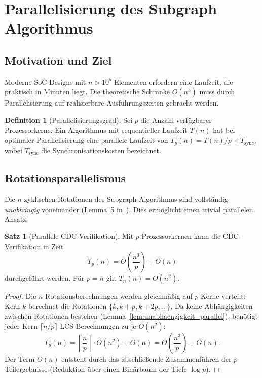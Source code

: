 ﻿\documentclass[a4paper,12pt]{article}
\theoremstyle{definition}
\newtheorem{definition}{Definition}
\newtheorem{satz}{Satz}
\begin{document}
	\section{Parallelisierung des Subgraph Algorithmus}
	
	\subsection{Motivation und Ziel}
	
	Moderne SoC-Designs mit $n > 10^5$ Elementen erfordern eine
	Laufzeit, die praktisch in Minuten liegt. Die theoretische Schranke $O(n^3)$
	muss durch Parallelisierung auf realisierbare Ausf\"uhrungszeiten gebracht
	werden.
	
	\begin{definition}[Parallelisierungsgrad]
		Sei $p$ die Anzahl verf\"ugbarer Prozessorkerne. Ein Algorithmus mit
		sequentieller Laufzeit $T(n)$ hat bei optimaler Parallelisierung eine
		parallele Laufzeit von $T_p(n) = T(n) / p + T_{\mathrm{sync}}$,
		wobei $T_{\mathrm{sync}}$ die Synchronisationskosten bezeichnet.
	\end{definition}
	
	\subsection{Rotationsparallelismus}
	
	Die $n$ zyklischen Rotationen des Subgraph Algorithmus sind vollst\"andig
	\emph{unabh\"angig} voneinander (Lemma~5 in~\cite{epp2026subgraph}).
	Dies erm\"oglicht einen trivial parallelen Ansatz:
	
	\begin{satz}[Parallele CDC-Verifikation]
		\label{satz:parallel}
		Mit $p$ Prozessorkernen kann die CDC-Verifikation in Zeit
		\[
		T_p(n) = O\!\left(\frac{n^3}{p}\right) + O(n)
		\]
		durchgef\"uhrt werden. F\"ur $p = n$ gilt $T_n(n) = O(n^2)$.
	\end{satz}
	
	\begin{proof}
		Die $n$ Rotationsberechnungen werden gleichm\"a\ss{}ig auf $p$ Kerne verteilt:
		Kern $k$ berechnet die Rotationen $\{k, k+p, k+2p, \ldots\}$.
		Da keine Abh\"angigkeiten zwischen Rotationen bestehen
		(Lemma~\ref{lem:unabhaengigkeit_parallel}), ben\"otigt jeder Kern
		$\lceil n/p \rceil$ LCS-Berechnungen zu je $O(n^2)$:
		\[
		T_p(n) = \left\lceil \frac{n}{p} \right\rceil \cdot O(n^2) + O(n)
		= O\!\left(\frac{n^3}{p}\right) + O(n).
		\]
		Der Term $O(n)$ entsteht durch das abschlie\ss{}ende Zusammenf\"uhren der
		$p$ Teilergebnisse (Reduktion \"uber einen Bin\"arbaum der Tiefe $\log p$). \qedhere
	\end{proof}
	
\end{document}
